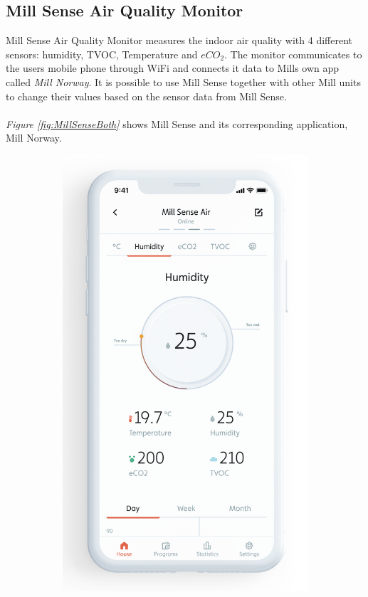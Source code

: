 \subsection{Mill Sense Air Quality Monitor}
Mill Sense Air Quality Monitor measures the indoor air quality with 4 different sensors: humidity, TVOC, Temperature and \(eCO_2\). \cite{Mill} The monitor communicates to the users mobile phone through WiFi and connects it data to Mills own app called \textit{Mill Norway}. It is possible to use Mill Sense together with other Mill units to change their values based on the sensor data from Mill Sense. 
\\\\
\textit{Figure \ref{fig:MillSenseBoth}} shows Mill Sense and its corresponding application, Mill Norway. 
\begin{figure} [!ht]
    \centering
    \begin{subfigure}{0.3\textwidth}
         \centering
         \includegraphics[width=1\textwidth]{figures/MillSenseApp.png}

\end{subfigure}
\end{figure}
